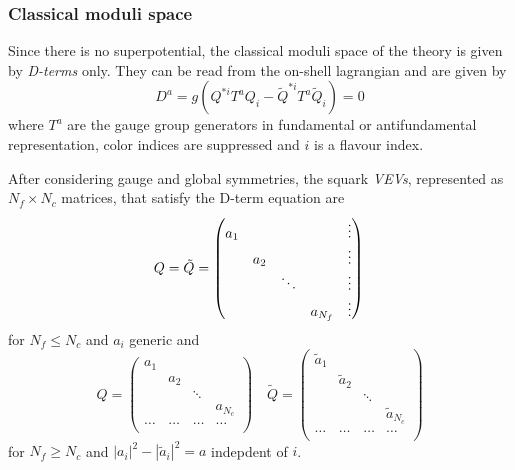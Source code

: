 \subsubsection{Classical moduli space}
Since there is no superpotential, the classical moduli space of the theory is given by \emph{D-terms} only. 
They can be read from the on-shell lagrangian and are given by
\begin{equation}
 D^a = g \left( Q^{*i} T^a Q_i - \tilde{Q}^{* i} T^a \tilde{Q}_i \right) = 0
\end{equation}
where $T^a$ are the gauge group generators in fundamental or antifundamental representation, color indices are suppressed and $i$ is a flavour index.

After considering gauge and global symmetries, the squark \emph{VEVs}, represented as $N_f \times N_c$ matrices, that satisfy the D-term equation are
\begin{equation}
Q = \tilde{Q} = 
\begin{pmatrix}
 a_1 & 		&	 &	 & \vdots \\
	 & a_2  & 	 & 	 & \vdots \\  	
 	 & 		&	\ddots &	 &\vdots  \\
	 &  & 	 & 	a_{N_f}  & \vdots
\end{pmatrix} 
 \\
\end{equation}
for  $N_f \le N_c$ and $a_i$ generic and
\begin{equation}
Q  = 
\begin{pmatrix} 
	 a_1 & 		&	 &	  \\
	 & a_2  & 	 & 	 \\  	
 	 & 		&	\ddots &	   \\
	 &  & 	 & 	a_{N_c}  \\
	 \dots & \dots & \dots & \dots\\ 
\end{pmatrix} 
\quad
\tilde{Q} = 
\begin{pmatrix}
 \tilde{a}_1 & 		&	 &	  \\
	 & \tilde{a}_2  & 	 & 	 \\  	
 	 & 		&	\ddots &	   \\
	 &  & 	 & 	\tilde{a}_{N_c}  \\
	 \dots & \dots & \dots & \dots\\ 
\end{pmatrix} 
\end{equation}
for $N_f \geq N_c$ and $ | a_i|^2 - | \tilde{a}_i |^2 = a $ indepdent of $i$.

